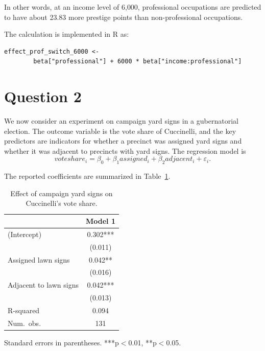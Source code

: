 \documentclass[12pt]{article}
\begin{document}
	In other words, at an income level of 6{,}000, professional occupations are
	predicted to have about 23.83 more prestige points than non-professional
	occupations.
	
	The calculation is implemented in R as:
	
	\begin{lstlisting}[style=RStyle]
		effect_prof_switch_6000 <-
		beta["professional"] + 6000 * beta["income:professional"]
	\end{lstlisting}
	
	\section*{Question 2}
	
	We now consider an experiment on campaign yard signs in a gubernatorial
	election. The outcome variable is the vote share of Cuccinelli, and the
	key predictors are indicators for whether a precinct was assigned yard
	signs and whether it was adjacent to precincts with yard signs. The
	regression model is
	\[
	voteshare_i = \beta_0 + \beta_1 assigned_i + \beta_2 adjacent_i
	+ \varepsilon_i.
	\]
	
	The reported coefficients are summarized in Table~\ref{tab:q2}.
	
	\begin{table}[h!]
		\centering
		\caption{Effect of campaign yard signs on Cuccinelli's vote share.}
		\label{tab:q2}
		\begin{tabular}{l c}
			\toprule
			& Model 1 \\
			\midrule
			(Intercept)                     & 0.302*** \\
			& (0.011)  \\
			Assigned lawn signs            & 0.042**  \\
			& (0.016)  \\
			Adjacent to lawn signs         & 0.042*** \\
			& (0.013)  \\
			\midrule
			R-squared                      & 0.094    \\
			Num.\ obs.                     & 131      \\
			\bottomrule
		\end{tabular}
		
		\begin{flushleft}
			{\footnotesize Standard errors in parentheses.
				***p$<$0.01, **p$<$0.05.}
		\end{flushleft}
	\end{table}
	
\end{document}
